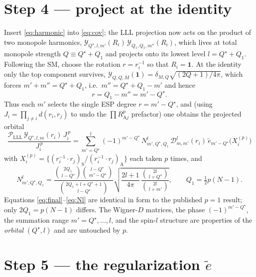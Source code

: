 \documentclass[11pt]{article}
\newcommand{\LLL}{\mathcal{P}_{\mathrm{LLL}}}
\newcommand{\Ycal}{\mathcal{Y}}
\newcommand{\Dcal}{\mathcal{D}}
\newcommand{\Qs}{Q^{\star}}
\newcommand{\etil}{\tilde{e}}
\begin{document}
\section{Step 4 --- project at the identity}

Insert \eqref{eq:harmonic} into \eqref{eq:cov}; the LLL projection now acts on the product of
two monopole harmonics, $\Ycal_{\Qs,l,m'}(R_i)\,\Ycal_{Q_1,Q_1,m''}(R_i)$, which lives at total
monopole strength $Q\equiv\Qs+Q_1$ and projects onto its lowest level $l=\Qs+Q_1$. Following the
SM, choose the rotation $r=r_i^{-1}$ so that $R_i=\mathbf 1$. At the identity only the top
component survives, $\Ycal_{Q,Q,M}(\mathbf 1)=\delta_{M,Q}\sqrt{(2Q+1)/4\pi}$, which forces
$m'+m''=\Qs+Q_1$, i.e.\ $m''=\Qs+Q_1-m'$ and hence
\begin{equation}
  r=Q_1-m''=m'-\Qs .
\end{equation}
Thus each $m'$ selects the single ESP degree $r=m'-\Qs$, and (using $J_i=\prod_{j\neq i}d(r_i,r_j)$
to undo the $\prod R_{\mathrm{A}j}^{p}$ prefactor) one obtains the projected orbital
\begin{equation}
  \boxed{\;
  \frac{\LLL\,\Ycal_{\Qs,l,m}(r_i)\,J_i^{\,p}}{J_i^{\,p}}
  =\sum_{m'=\Qs}^{l}(-1)^{m'-\Qs}\,
   N^{l}_{m',\Qs,Q_1}\,\Dcal^{l}_{m,m'}(r_i)\,
   \etil_{m'-\Qs}\!\big(X_i^{(p)}\big)\;}
  \label{eq:final}
\end{equation}
with $X_i^{(p)}=\{(r_i^{-1}\!\cdot r_j)_{\mathrm S}/(r_i^{-1}\!\cdot r_j)_{\mathrm A}\}$ each taken
$p$ times, and
\begin{equation}
  N^{l}_{m',\Qs,Q_1}
  =\frac{\binom{2Q_1}{\,l-\Qs}\binom{l-\Qs}{\,m'-\Qs}}{\binom{2Q_1+l+\Qs+1}{\,l-\Qs}}
   \sqrt{\frac{2l+1}{4\pi}\,\frac{\binom{2l}{\,l+\Qs}}{\binom{2l}{\,l+m'}}},
  \qquad Q_1=\tfrac{1}{2}p(N-1).
  \label{eq:Nl}
\end{equation}
Equations \eqref{eq:final}--\eqref{eq:Nl} are identical in form to the published $p=1$ result;
only $2Q_1=p(N-1)$ differs. The Wigner-$D$ matrices, the phase $(-1)^{m'-\Qs}$, the summation
range $m'=\Qs,\dots,l$, and the spin-$l$ structure are properties of the \emph{orbital}
$(\Qs,l)$ and are untouched by $p$.

\section{Step 5 --- the regularization $\etil$}
\end{document}
